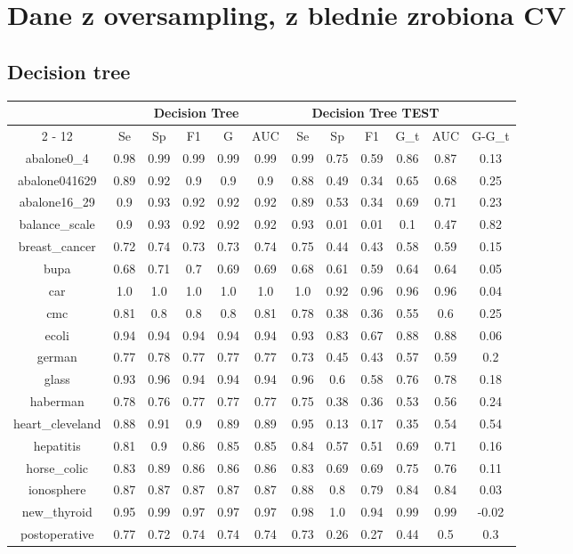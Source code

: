 \documentclass{article}%
\begin{document}
%
\section*{Dane z oversampling, z blednie zrobiona CV}%
\subsection*{Decision tree}%
\begin{tabular}{|c|c|c|c|c|c|c|c|c|c|c|c|}%
\hline%
&\multicolumn{5}{|c|}{Decision Tree}&\multicolumn{5}{|c|}{Decision Tree TEST}&\\%
\cline{2%
-%
12}%
&Se&Sp&F1&G&AUC&Se&Sp&F1&G\_t&AUC&G{-}G\_t\\%
\hline%
abalone0\_4&0.98&0.99&0.99&0.99&0.99&0.99&0.75&0.59&0.86&0.87&0.13\\%
abalone041629&0.89&0.92&0.9&0.9&0.9&0.88&0.49&0.34&0.65&0.68&0.25\\%
abalone16\_29&0.9&0.93&0.92&0.92&0.92&0.89&0.53&0.34&0.69&0.71&0.23\\%
balance\_scale&0.9&0.93&0.92&0.92&0.92&0.93&0.01&0.01&0.1&0.47&0.82\\%
breast\_cancer&0.72&0.74&0.73&0.73&0.74&0.75&0.44&0.43&0.58&0.59&0.15\\%
bupa&0.68&0.71&0.7&0.69&0.69&0.68&0.61&0.59&0.64&0.64&0.05\\%
car&1.0&1.0&1.0&1.0&1.0&1.0&0.92&0.96&0.96&0.96&0.04\\%
cmc&0.81&0.8&0.8&0.8&0.81&0.78&0.38&0.36&0.55&0.6&0.25\\%
ecoli&0.94&0.94&0.94&0.94&0.94&0.93&0.83&0.67&0.88&0.88&0.06\\%
german&0.77&0.78&0.77&0.77&0.77&0.73&0.45&0.43&0.57&0.59&0.2\\%
glass&0.93&0.96&0.94&0.94&0.94&0.96&0.6&0.58&0.76&0.78&0.18\\%
haberman&0.78&0.76&0.77&0.77&0.77&0.75&0.38&0.36&0.53&0.56&0.24\\%
heart\_cleveland&0.88&0.91&0.9&0.89&0.89&0.95&0.13&0.17&0.35&0.54&0.54\\%
hepatitis&0.81&0.9&0.86&0.85&0.85&0.84&0.57&0.51&0.69&0.71&0.16\\%
horse\_colic&0.83&0.89&0.86&0.86&0.86&0.83&0.69&0.69&0.75&0.76&0.11\\%
ionosphere&0.87&0.87&0.87&0.87&0.87&0.88&0.8&0.79&0.84&0.84&0.03\\%
new\_thyroid&0.95&0.99&0.97&0.97&0.97&0.98&1.0&0.94&0.99&0.99&{-}0.02\\%
postoperative&0.77&0.72&0.74&0.74&0.74&0.73&0.26&0.27&0.44&0.5&0.3\\%

\end{tabular}
\end{document}
